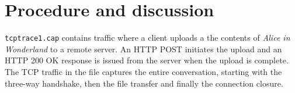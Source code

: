 \section{Procedure and discussion}\label{sec:discussion}
\texttt{tcp\-trace\-1.cap} contains traffic where a client uploads a the contents of \emph{Alice in Wonderland} to a remote server.
An HTTP POST initiates the upload and an HTTP 200 OK response is issued from the server when the upload is complete.
The TCP traffic in the file captures the entire conversation, starting with the three-way handshake, then the file transfer and finally the connection closure.








